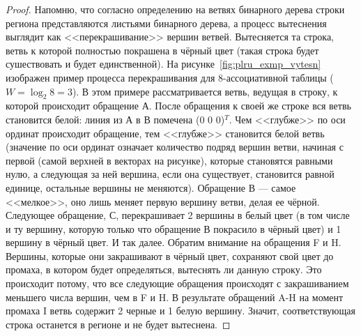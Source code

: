 \begin{theorem}\label{PLRUusefulThm}
\PLRUusefuls
\end{theorem}
\begin{proof}
  Напомню, что согласно определению на ветвях бинарного дерева строки региона представляются листьями бинарного дерева, а  процесс вытеснения выглядит как <<перекрашивание>> вершин ветвей. Вытесняется та строка, ветвь к которой полностью покрашена в чёрный цвет (такая строка будет сушествовать и будет единственной). На рисунке~\ref{fig:plru_exmp_vytesn} изображен пример процесса перекрашивания для 8-ассоциативной таблицы ($W = \log_2 8 = 3$). В этом примере рассматривается ветвь, ведущая в строку, к которой происходит обращение А. После обращения к своей же строке вся ветвь становится белой: линия из А в В помечена (0 0 0)$^T$. Чем <<глубже>> по оси ординат происходит обращение, тем <<глубже>> становится белой ветвь (значение по оси ординат означает количество подряд вершин ветви, начиная с первой (самой верхней в векторах на рисунке), которые становятся равными нулю, а следующая за ней вершина, если она существует, становится равной единице, остальные вершины не меняются). Обращение В --- самое <<мелкое>>, оно лишь меняет первую вершину ветви, делая ее чёрной. Следующее обращение, С, перекрашивает 2 вершины в белый цвет (в том числе и ту вершину, которую только что обращение В покрасило в чёрный цвет) и 1 вершину в чёрный цвет. И так далее. Обратим внимание на обращения F и H. Вершины, которые они закрашивают в чёрный цвет, сохраняют свой цвет до промаха, в котором будет определяться, вытеснять ли данную строку. Это происходит потому, что все следующие обращения происходят с закрашиванием меньшего числа вершин, чем в F и H. В результате обращений A-H на момент промаха I ветвь содержит 2 черные и 1 белую вершину. Значит, соответствующая строка останется в регионе и не будет вытеснена.


\end{proof}
